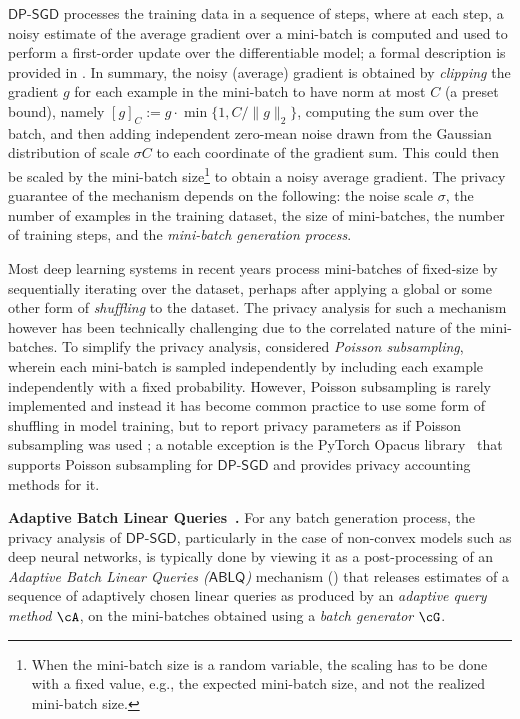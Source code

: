 \documentclass[twoside]{article}
\theoremstyle{definition}
\newcommand{\DPSGD}{\mathsf{DP}\text{-}\mathsf{SGD}}
\newcommand{\ABLQ}{\mathsf{ABLQ}}
\begin{document}
$\DPSGD$ processes the training data in a sequence of steps, where at each step, a noisy estimate of the average gradient over a mini-batch is computed and used to perform a first-order update over the differentiable model; a formal description is provided in .  In summary, the noisy (average) gradient is obtained by {\em clipping} the gradient $g$ for each example in the mini-batch to have norm at most $C$ (a preset bound), namely $[g]_C := g \cdot \min\{1, C / \|g\|_2\}$, computing the sum over the batch, and then adding independent zero-mean noise drawn from the Gaussian distribution of scale $\sigma C$ to each coordinate of the gradient sum.
This could then be scaled by the mini-batch size\footnote{When the mini-batch size is a random variable, the scaling has to be done with a fixed value, e.g., the expected mini-batch size, and not the realized mini-batch size.} to obtain a noisy average gradient.
The privacy guarantee of the mechanism depends on the following: the noise scale $\sigma$, the number of examples in the training dataset, the size of mini-batches, the number of training steps, and the {\em mini-batch generation process}.

Most deep learning systems in recent years process mini-batches of fixed-size by sequentially iterating over the dataset, perhaps after applying a global or some other form of {\em shuffling} to the dataset.
The privacy analysis for such a mechanism however has been technically challenging due to the correlated nature of the mini-batches. To simplify the privacy analysis, \cite{abadi16deep} considered {\em Poisson subsampling}, wherein each mini-batch is sampled independently by including each example independently with a fixed probability. However, Poisson subsampling is rarely implemented and instead it has become common practice to use some form of shuffling in model training, but to report privacy parameters as if Poisson subsampling was used \citep[\S4.3]{ponomareva23dpfy}; a notable exception is the PyTorch Opacus library~\citep{yousefpour21opacus} that supports Poisson subsampling for $\DPSGD$ and provides privacy accounting methods for it.

{\bf Adaptive Batch Linear Queries~\citep{chua24private}.}
For any batch generation process, the privacy analysis of $\DPSGD$, particularly in the case of non-convex models such as deep neural networks, is typically done by viewing it as a post-processing of an {\em Adaptive Batch Linear Queries ($\ABLQ$)} mechanism () that releases estimates of a sequence of adaptively chosen linear queries as produced by an {\em adaptive query method $\cA$}, on the mini-batches obtained using a {\em batch generator} $\cG$.
\end{document}
